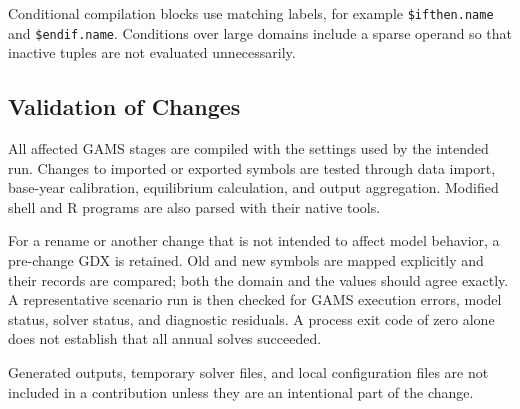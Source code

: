 Conditional compilation blocks use matching labels, for example \texttt{\$ifthen.name} and \texttt{\$endif.name}. Conditions over large domains include a sparse operand so that inactive tuples are not evaluated unnecessarily.

\subsection{Validation of Changes}

All affected GAMS stages are compiled with the settings used by the intended run. Changes to imported or exported symbols are tested through data import, base-year calibration, equilibrium calculation, and output aggregation. Modified shell and R programs are also parsed with their native tools.

For a rename or another change that is not intended to affect model behavior, a pre-change GDX is retained. Old and new symbols are mapped explicitly and their records are compared; both the domain and the values should agree exactly. A representative scenario run is then checked for GAMS execution errors, model status, solver status, and diagnostic residuals. A process exit code of zero alone does not establish that all annual solves succeeded.

Generated outputs, temporary solver files, and local configuration files are not included in a contribution unless they are an intentional part of the change.
